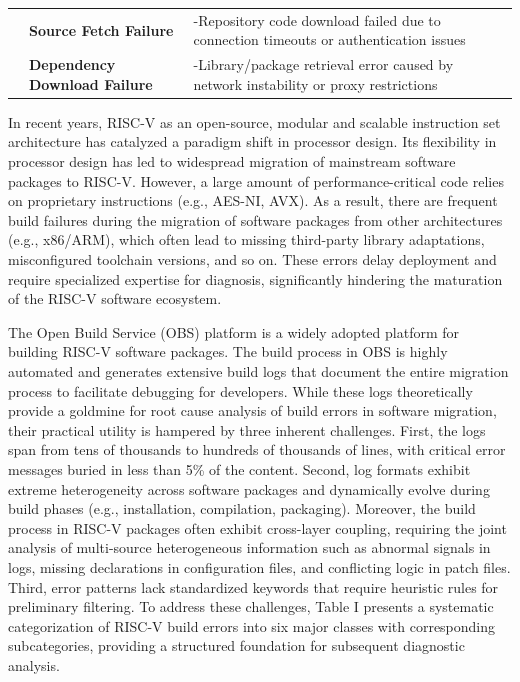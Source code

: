\documentclass[10pt,conference]{IEEEtran}
\begin{document}
\begin{table}[htbp]
\begin{tabularx}{\textwidth}{|>{\bfseries}l|>{\bfseries}l|X|}
\multirow{2}{*}{Network Error} 
& Source Fetch Failure        &-Repository code download failed due to connection timeouts or authentication issues \\
& Dependency Download Failure &-Library/package retrieval error caused by network instability or proxy restrictions \\
\hline

\end{tabularx}
\end{table}


In recent years, RISC-V as an open-source, modular and scalable instruction set architecture has catalyzed a paradigm shift in processor design\cite{r1,r4}. Its flexibility in processor design has led to widespread migration of mainstream software packages to RISC-V\cite{r16}. However, a large amount of performance-critical code relies on proprietary instructions (e.g., AES-NI, AVX). As a result, there are frequent build failures during the migration of software packages from other architectures (e.g., x86/ARM), which often lead to missing third-party library adaptations, misconfigured toolchain versions, and so on. These errors delay deployment and require specialized expertise for diagnosis, significantly hindering the maturation of the RISC-V software ecosystem.

The Open Build Service (OBS) platform is a widely adopted platform for building RISC-V software packages. The build process in OBS is highly automated and generates extensive build logs that document the entire migration process to facilitate debugging for developers. While these logs theoretically provide a goldmine for root cause analysis of build errors in software migration, their practical utility is hampered by three inherent challenges. First, the logs span from tens of thousands to hundreds of thousands of lines, with critical error messages buried in less than 5\% of the content. Second, log formats exhibit extreme heterogeneity across software packages and dynamically evolve during build phases (e.g., installation, compilation, packaging). Moreover, the build process in RISC-V packages often exhibit cross-layer coupling, requiring the joint analysis of multi-source heterogeneous information such as abnormal signals in logs, missing declarations in configuration files, and conflicting logic in patch files. Third, error patterns lack standardized keywords that require heuristic rules for preliminary filtering. To address these challenges, Table I presents a systematic categorization of RISC-V build errors into six major classes with corresponding subcategories, providing a structured foundation for subsequent diagnostic analysis.
\end{document}
